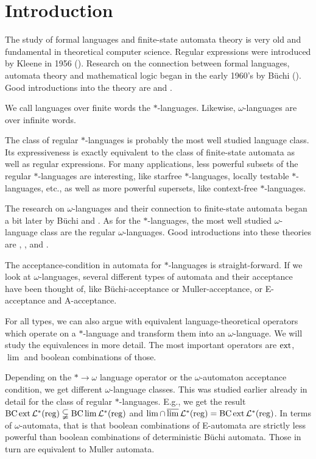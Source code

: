 
\section{Introduction}

The study of formal languages and finite-state automata theory is very old and fundamental in theoretical computer science. Regular expressions were introduced by Kleene in 1956 (\cite{Kleene56}). Research on the connection between formal languages, automata theory and mathematical logic began in the early 1960's by Büchi (\cite{Buchi60}). Good introductions into the theory are \cite{FinAutLogR109} and \cite{LangAutLogicR102}.

We call languages over finite words the $*$-languages. Likewise, $\omega$-languages are over infinite words.

The class of regular $*$-languages is probably the most well studied language class. Its expressiveness is exactly equivalent to the class of finite-state automata as well as regular expressions. For many applications, less powerful subsets of the regular $*$-languages are interesting, like starfree $*$-languages, locally testable $*$-languages, etc., as well as more powerful supersets, like context-free $*$-languages.

The research on $\omega$-languages and their connection to finite-state automata began a bit later by Büchi \cite{DecisionSOR111} and \cite{Muller63}. As for the $*$-languages, the most well studied $\omega$-language class are the regular $\omega$-languages. Good introductions into these theories are \cite{AutInfObjsR103}, \cite{InfCompR101}, \cite{OmLangR108} and \cite{InfWordsR110}.

The acceptance-condition in automata for $*$-languages is straight-forward. If we look at $\omega$-languages, several different types of automata and their acceptance have been thought of, like Büchi-acceptance or Muller-acceptance, or E-acceptance and A-acceptance.

For all types, we can also argue with equivalent language-theoretical operators which operate on a $*$-language and transform them into an $\omega$-language. We will study the equivalences in more detail. The most important operators are $\operatorname{ext}$, $\lim$ and boolean combinations of those.

Depending on the $* \rightarrow \omega$ language operator or the $\omega$-automaton acceptance condition, we get different $\omega$-language classes. This was studied earlier already in detail for the class of regular $*$-languages. E.g., we get the result $\operatorname{BC} \operatorname{ext} \mathcal{L}^*(\textup{\textrm{reg}}) \subsetneqq \operatorname{BC} \lim \mathcal{L}^*(\textup{\textrm{reg}})$ and $\lim \cap \operatorname{\overline{lim}} \mathcal{L}^*(\textup{\textrm{reg}}) = \operatorname{BC} \operatorname{ext} \mathcal{L}^*(\textup{\textrm{reg}})$. In terms of $\omega$-automata, that is that boolean combinations of E-automata are strictly less powerful than boolean combinations of deterministic Büchi automata. Those in turn are equivalent to Muller automata.

